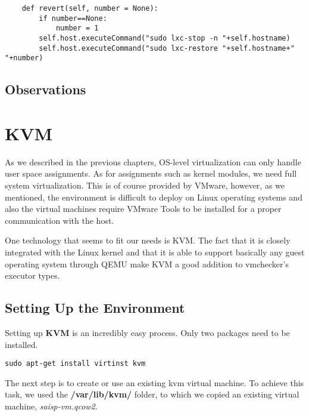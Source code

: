 \lstset{caption=Restoring the Container to a Previous State, language=python, label=lst:lxc-revert}
\begin{lstlisting}
    def revert(self, number = None):
        if number==None:
            number = 1
        self.host.executeCommand("sudo lxc-stop -n "+self.hostname)
        self.host.executeCommand("sudo lxc-restore "+self.hostname+" "+number)
\end{lstlisting}

\subsection{Observations}
\label{sec:vmc-lxc-comments}


\section{KVM}
\label{sec:vmc-kvm}

As we described in the previous chapters, OS-level virtualization can only
handle user space assignments. As for assignments such as kernel modules,
we need full system virtualization. This is of course provided by VMware,
however, as we mentioned, the environment is difficult to deploy on 
Linux operating systems and also the virtual machines require VMware Tools
to be installed for a proper communication with the host.

One technology that seems to fit our needs is KVM. The fact that it is closely
integrated with the Linux kernel and that it is able to support basically
any guest operating system through QEMU make KVM a good addition to vmchecker's 
executor types.

\subsection{Setting Up the Environment}
\label{sub-sec:vmc-kvm-setup}

Setting up \textbf{KVM} is an incredibly easy process. Only two packages need
to be installed.

\lstset{caption=Install the Needed Packages, label=lst:kvm-deps}
\begin{lstlisting}
sudo apt-get install virtinst kvm
\end{lstlisting}

The next step is to create or use an existing kvm virtual machine.
To achieve this task, we used the \textbf{/var/lib/kvm/} folder, to which
we copied an existing virtual machine, \textit{saisp-vm.qcow2}.

